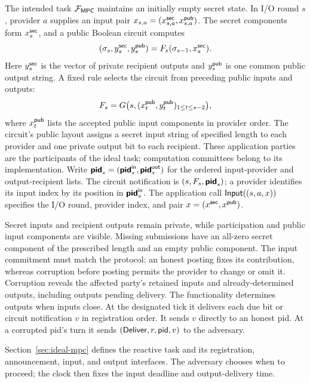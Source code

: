 The intended task $\mathcal F_{\mathsf{MPC}}$ maintains an initially empty secret state.
In I/O round $s$, provider $a$ supplies an input pair
$x_{s,a}=(x^{\mathsf{sec}}_{s,a},x^{\mathsf{pub}}_{s,a})$.  The secret components form
$x^{\mathsf{sec}}_s$, and a public Boolean circuit computes
\[
  (\sigma_s,y^{\mathsf{sec}}_s,y^{\mathsf{pub}}_s)=F_s(\sigma_{s-1},x^{\mathsf{sec}}_s).
\]
Here $y^{\mathsf{sec}}_s$ is the vector of private recipient outputs and $y^{\mathsf{pub}}_s$
is one common public output string.  A fixed rule selects the circuit from
preceding public inputs and outputs:
\[
  F_s=G\bigl(s,(x^{\mathsf{pub}}_t,y^{\mathsf{pub}}_t)_{1\leq t\leq s-2}\bigr),
\]
where $x^{\mathsf{pub}}_t$ lists the accepted public input components in provider
order.  The circuit's public layout assigns a secret input string of
specified length to each provider and one private output bit to each recipient.
These application parties are the participants of the ideal task;
computation committees belong to its implementation.  Write
$\boldsymbol{\mathsf{pid}}_s=(\boldsymbol{\mathsf{pid}}^{\mathsf{in}}_s,
\boldsymbol{\mathsf{pid}}^{\mathsf{out}}_s)$ for the ordered input-provider and
output-recipient lists.  The circuit notification is
$(s,F_s,\boldsymbol{\mathsf{pid}}_s)$; a provider identifies its input index by
its position in $\boldsymbol{\mathsf{pid}}^{\mathsf{in}}_s$.
The application call $\mathsf{Input}((s,a,x))$ specifies the I/O round, provider
index, and pair $x=(x^{\mathsf{sec}},x^{\mathsf{pub}})$.

Secret inputs and recipient outputs remain private, while participation
and public input components are visible.  Missing submissions have an
all-zero secret component of the prescribed length and an empty public
component.  The input commitment must match the protocol: an honest posting
fixes its contribution, whereas corruption before posting permits the
provider to change or omit it.  Corruption reveals the affected party's
retained inputs and already-determined outputs, including outputs pending
delivery.  The functionality determines outputs when inputs close.
At the designated tick it delivers each due bit or circuit notification
$v$ in registration order.  It sends $v$ directly to an honest pid.
At a corrupted pid's turn it sends $(\mathsf{Deliver},r,\mathsf{pid},v)$ to the adversary.

Section~\ref{sec:ideal-mpc} defines the reactive task and its
registration, announcement, input, and output interfaces.  The adversary
chooses when to proceed; the clock then fixes the input deadline and
output-delivery time.

